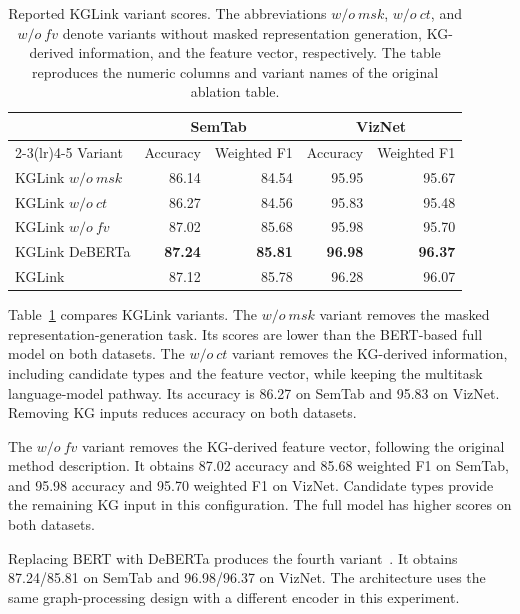 \begin{table}[tbp]
\centering
\caption{Reported KGLink variant scores. The abbreviations $w/o\ msk$, $w/o\ ct$, and $w/o\ fv$ denote variants without masked representation generation, KG-derived information, and the feature vector, respectively. The table reproduces the numeric columns and variant names of the original ablation table.}
\label{tab:kglink:ablation}
\begin{tabular}{lrrrr}
\toprule
&\multicolumn{2}{c}{SemTab}&\multicolumn{2}{c}{VizNet}\\
\cmidrule(lr){2-3}\cmidrule(lr){4-5}
Variant&Accuracy&Weighted F1&Accuracy&Weighted F1\\
\midrule
KGLink $w/o\ msk$&86.14&84.54&95.95&95.67\\
KGLink $w/o\ ct$&86.27&84.56&95.83&95.48\\
KGLink $w/o\ fv$&87.02&85.68&95.98&95.70\\
KGLink DeBERTa&\textbf{87.24}&\textbf{85.81}&\textbf{96.98}&\textbf{96.37}\\
KGLink&87.12&85.78&96.28&96.07\\
\bottomrule
\end{tabular}
\end{table}

Table~\ref{tab:kglink:ablation} compares KGLink variants. The $w/o\ msk$ variant removes the masked representation-generation task. Its scores are lower than the BERT-based full model on both datasets. The $w/o\ ct$ variant removes the KG-derived information, including candidate types and the feature vector, while keeping the multitask language-model pathway. Its accuracy is 86.27 on SemTab and 95.83 on VizNet. Removing KG inputs reduces accuracy on both datasets.

The $w/o\ fv$ variant removes the KG-derived feature vector, following the original method description. It obtains 87.02 accuracy and 85.68 weighted F1 on SemTab, and 95.98 accuracy and 95.70 weighted F1 on VizNet. Candidate types provide the remaining KG input in this configuration. The full model has higher scores on both datasets.

Replacing BERT with DeBERTa produces the fourth variant~\cite{kglink-he2020deberta}. It obtains 87.24/85.81 on SemTab and 96.98/96.37 on VizNet. The architecture uses the same graph-processing design with a different encoder in this experiment.

